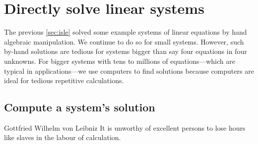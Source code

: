 
\section{Directly solve linear systems}
\label{sec:dmsls}
\secttoc

\begin{comment}
\pooliv{p.64--82}  \layiv{\S1.2} \holti{\S1.2}
\end{comment}




The previous \autoref{sec:isle} solved some example systems of linear equations by hand algebraic manipulation.  
We  continue to do so for small systems.  
However, such by-hand solutions are tedious for systems bigger than say four equations in four unknowns.  
For bigger systems with tens to millions of equations---which are typical in applications---we use computers to find solutions because computers are ideal for tedious repetitive calculations.


\subsection{Compute a system's solution}

\begin{quoted}{Gottfried Wilhelm von Leibniz}
It is unworthy of excellent persons to lose hours like slaves in the labour of calculation.
\end{quoted}

